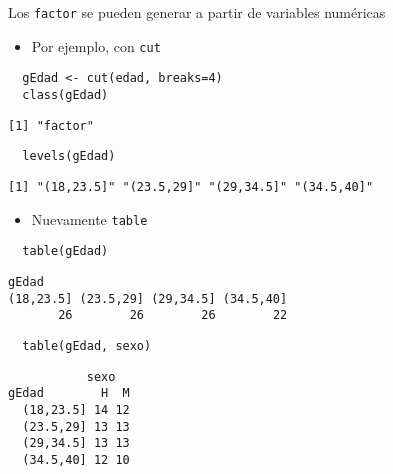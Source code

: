 \documentclass[xcolor={usenames,svgnames,dvipsnames}]{beamer}
\begin{document}
\begin{frame}[fragile,label=sec-1-6]{Los \texttt{factor} se pueden generar a partir de variables numéricas}
 \begin{itemize}
\item Por ejemplo, con \texttt{cut}
\end{itemize}
\lstset{language=R,label= ,caption= ,numbers=none}
\begin{lstlisting}
  gEdad <- cut(edad, breaks=4)
  class(gEdad)
\end{lstlisting}

\begin{verbatim}
[1] "factor"
\end{verbatim}

\lstset{language=R,label= ,caption= ,numbers=none}
\begin{lstlisting}
  levels(gEdad)
\end{lstlisting}

\begin{verbatim}
[1] "(18,23.5]" "(23.5,29]" "(29,34.5]" "(34.5,40]"
\end{verbatim}

\begin{itemize}
\item Nuevamente \texttt{table}
\end{itemize}
\lstset{language=R,label= ,caption= ,numbers=none}
\begin{lstlisting}
  table(gEdad)
\end{lstlisting}

\begin{verbatim}
gEdad
(18,23.5] (23.5,29] (29,34.5] (34.5,40] 
       26        26        26        22
\end{verbatim}

\lstset{language=R,label= ,caption= ,numbers=none}
\begin{lstlisting}
  table(gEdad, sexo)
\end{lstlisting}

\begin{verbatim}
           sexo
gEdad        H  M
  (18,23.5] 14 12
  (23.5,29] 13 13
  (29,34.5] 13 13
  (34.5,40] 12 10
\end{verbatim}
\end{frame}
\end{document}
